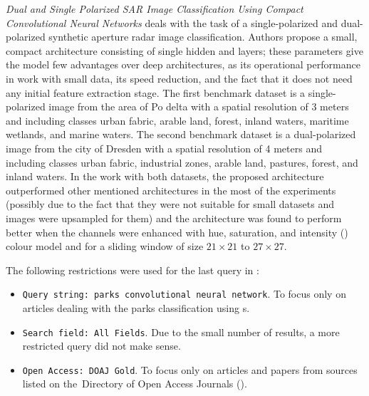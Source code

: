 \textit{Dual and Single Polarized SAR Image Classification Using Compact Convolutional Neural Networks} deals with the task of a single-polarized and dual-polarized synthetic aperture radar  image classification. Authors propose a small, compact  architecture consisting of single hidden  and  layers; these parameters give the model few advantages over deep architectures, as its operational performance in work with small data, its speed reduction, and the fact that it does not need any initial feature extraction stage. The first benchmark dataset is a single-polarized  image from the area of Po delta with a spatial resolution of 3 meters and including classes urban fabric, arable land, forest, inland waters, maritime wetlands, and marine waters. The second benchmark dataset is a dual-polarized  image from the city of Dresden with a spatial resolution of 4 meters and including classes urban fabric, industrial zones, arable land, pastures, forest, and inland waters. In the work with both datasets, the proposed architecture outperformed other mentioned architectures in the most of the experiments (possibly due to the fact that they were not suitable for small datasets and images were upsampled for them) and the architecture was found to perform better when the channels were enhanced with hue, saturation, and intensity () colour model and for a sliding window of size $21 \times 21$ to $27 \times 27$.

The following restrictions were used for the last query in :

\begin{itemize}
	\item \verb|Query string: parks convolutional neural network|. To focus only on articles dealing with the parks classification using s.
	\item \verb|Search field: All Fields|. Due to the small number of results, a more restricted query did not make sense.
	\item \verb|Open Access: DOAJ Gold|. To focus only on articles and papers from sources listed on the~Di\-rectory of Open Access Journals ().
\end{itemize}

